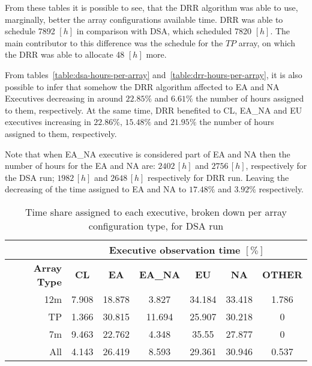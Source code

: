 From these tables it is possible to see, that the DRR algorithm was able to use, marginally, better the array configurations available time. DRR was able to schedule 7892 $[h]$ in comparison with DSA, which scheduled 7820 $[h]$. The main contributor to this difference was the schedule for the $TP$ array, on which the DRR was able to allocate 48 $[h]$ more. 

From tables~\ref{table:dsa-hours-per-array} and~\ref{table:drr-hours-per-array}, it is also possible to infer that somehow the DRR algorithm affected to EA and NA Executives decreasing in around $22.85\%$ and $6.61\%$ the number of hours assigned to them, respectively. At the same time, DRR benefited to CL, EA\_NA and EU executives increasing in $22.86\%$, $15.48\%$ and $21.95\%$ the number of hours assigned to them, respectively.

Note that when EA\_NA executive is considered part of EA and NA then the number of hours for the EA and NA are: $2402\,[h]$ and $2756\,[h]$, respectively for the DSA run; $1982\,[h]$ and $2648\,[h]$ respectively for DRR run. Leaving the decreasing of the time assigned to EA and NA to $17.48\%$ and $3.92\%$ respectively.  

\begin{table}[t]
\centering
\begin{tabular}{c|c|c|c|c|c|c|} 
\cline{2-7}
 & \multicolumn{6}{c|}{\textbf{Executive observation time $[\%]$}} \\ \hline
\multicolumn{1}{|r|}{\textbf{Array Type}} & \textbf{CL}	& \textbf{EA} & \textbf{EA\_NA} & \textbf{EU} & \textbf{NA} & \textbf{OTHER} \\ \hline
\multicolumn{1}{|r|}{12m} & 7.908 & 18.878 & 3.827 & 34.184 & 33.418 & 1.786 \\ \hline
\multicolumn{1}{|r|}{TP} & 1.366 & 30.815 & 11.694 & 25.907 & 30.218 & 0 \\ \hline
\multicolumn{1}{|r|}{7m} & 9.463 & 22.762 & 4.348 & 35.55 & 27.877 & 0 \\ \hline
\multicolumn{1}{|r|}{All} & 4.143 & 26.419 & 8.593 & 29.361 & 30.946 & 0.537 \\ \hline
\end{tabular}
\caption{Time share assigned to each executive, broken down per array configuration type, for DSA run}
\label{table:dsa-percentage-per-array}
\end{table}

